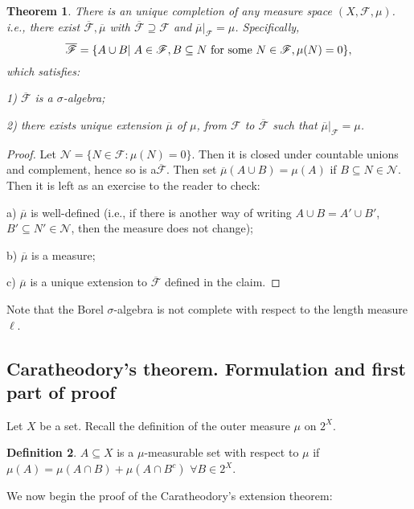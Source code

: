 \documentclass{article}
\newtheorem{theorem}{Theorem}[section]
\theoremstyle{definition}
\newtheorem{definition}[theorem]{Definition}
\begin{document}
\begin{theorem}
There is an unique completion of any measure space $(X,\mathscr{F},\mu)$. i.e., there exist $\overline{\mathscr{F}}, \overline{\mu}$ with $\overline{\mathscr{F}} \supseteq \mathscr{F}$ and $\overline{\mu}|_\mathscr{F} = \mu$. Specifically, 
$$\overline{\mathscr{F}} = \{A \cup B| \hspace{1mm} A \in \mathscr{F}, B \subseteq N \textnormal{ for some } N \in \mathscr{F}, \mu(N)=0 \},$$
which satisfies:

1) $\overline{\mathscr{F}}$ is a $\sigma$-algebra;

2) there exists unique extension $\overline{\mu}$ of $\mu$, from $\mathscr{F}$ to $\overline{\mathscr{F}}$ such that $\overline{\mu}|_\mathscr{F} = \mu$. 
\end{theorem}
\begin{proof}
Let $\mathscr{N} = \{N \in \mathscr{F}: \mu(N) = 0\}$. Then it is closed under countable unions and complement, hence so is a$\overline{\mathscr{F}}$. Then set $\overline{\mu}(A \cup B) = \mu(A)$
if $B\subseteq N\in \mathscr{N}$. Then it is left as an exercise to the reader to check:

a) $\overline{\mu}$ is well-defined (i.e., if there
is another way of writing $A\cup B=A'\cup B'$, $B'\subseteq N'\in \mathscr{N}$, then the measure
does not change);

b) $\overline{\mu}$ is a measure;

c) $\overline{\mu}$ is a unique extension to $\overline{\mathscr{F}}$ defined in 
the claim.
\end{proof}

Note that the Borel $\sigma$-algebra is not complete with respect to the length measure $\ell$.

\subsection{Caratheodory's theorem. Formulation and first part of proof}

Let $X$ be a set. Recall the definition of the outer measure $\mu$ on $2^X$.

\begin{definition}
$A \subseteq X$ is a $\mu$-measurable set with respect to $\mu$ if $\mu(A) = \mu(A\cap B) + \mu(A \cap B^c)$ $\forall B \in 2^X$.
\end{definition}

We now begin the proof of the 
Caratheodory's extension theorem:
\end{document}

